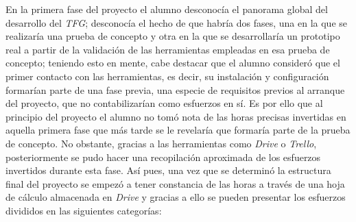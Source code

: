 En la primera fase del proyecto el alumno desconocía el panorama global del desarrollo del \textit{TFG}; desconocía el hecho de que habría dos fases, una en la que se realizaría una prueba de concepto y otra en la que se desarrollaría un prototipo real a partir de la validación de las herramientas empleadas en esa prueba de concepto; teniendo esto en mente, cabe destacar que el alumno consideró que el primer contacto con las herramientas, es decir, su instalación y configuración formarían parte de una fase previa, una especie de requisitos previos al arranque del proyecto, que no contabilizarían como esfuerzos en sí. Es por ello que al principio del proyecto el alumno no tomó nota de las horas precisas invertidas en aquella primera fase que más tarde se le revelaría que formaría parte de la prueba de concepto. No obstante, gracias a las herramientas como \textit{Drive} o \textit{Trello}, posteriormente se pudo hacer una recopilación aproximada de los esfuerzos invertidos durante esta fase. Así pues, una vez que se determinó la estructura final del proyecto se empezó a tener constancia de las horas a través de una hoja de cálculo almacenada en \textit{Drive} y gracias a ello se pueden presentar los esfuerzos divididos en las siguientes categorías: 
